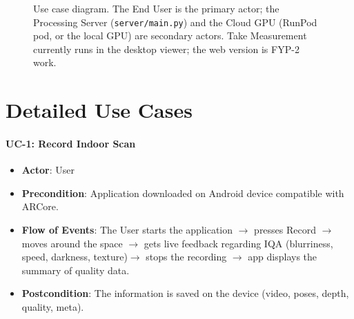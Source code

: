 \begin{figure}[htbp]
\centering
{}
\caption{Use case diagram. The End User is the primary actor; the Processing Server (\texttt{server/main.py}) and the Cloud GPU (RunPod pod, or the local GPU) are secondary actors. Take Measurement currently runs in the desktop viewer; the web version is FYP-2 work.}
\label{fig:usecase}
\end{figure}

\section{Detailed Use Cases}

\paragraph{UC-1: Record Indoor Scan}
\begin{itemize}
    \item \textbf{Actor}: User
    \item \textbf{Precondition}: Application downloaded on Android device compatible with ARCore.
    \item \textbf{Flow of Events}: The User starts the application $\rightarrow$ presses Record $\rightarrow$ moves around the space $\rightarrow$ gets live feedback regarding IQA (blurriness, speed, darkness, texture)$\rightarrow$ stops the recording $\rightarrow$ app displays the summary of quality data.
    \item \textbf{Postcondition}: The information is saved on the device (video, poses, depth, quality, meta).
\end{itemize}

